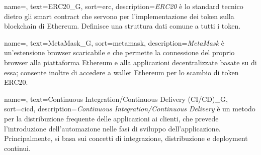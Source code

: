 {
    name=,
    text=ERC20_G,
    sort=erc,
    description={\emph{ERC20} è lo standard tecnico dietro gli smart contract che servono per l'implementazione dei token sulla blockchain di Ethereum. Definisce una struttura dati comune a tutti i token.}
}

{
    name=,
    text=MetaMask_G,
    sort=metamask,
    description={\emph{MetaMask} è un'estensione browser scaricabile e che permette la connessione del proprio browser alla piattaforma Ethereum e alla applicazioni decentralizzate basate su di essa; consente inoltre di accedere a wallet Ethereum per lo scambio di token ERC20.}
}

{
    name=,
    text=Continuous Integration/Continuous Delivery (CI/CD)_G,
    sort=cicd,
    description={\emph{Continuous Integration/Continuous Delivery} è un metodo per la distribuzione frequente delle applicazioni ai clienti, che prevede l’introduzione dell’automazione nelle fasi di sviluppo dell’applicazione. Principalmente, si basa sui concetti di integrazione, distribuzione e deployment continui.}
}